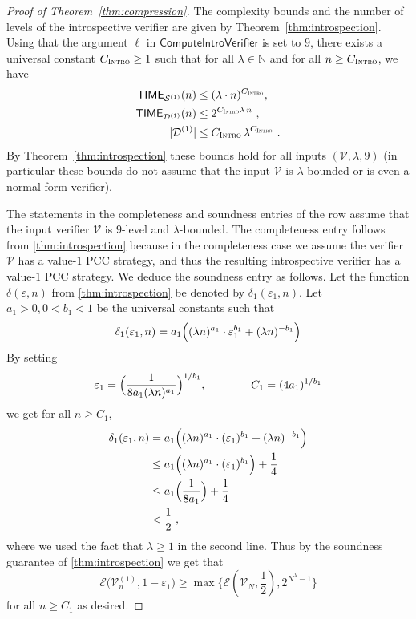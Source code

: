 \documentclass[11pt]{article}
\theoremstyle{definition}
\newcommand{\N}{\ensuremath{\mathbb{N}}}
\newcommand{\eps}{\varepsilon}
\newcommand{\sampler}{\mathcal{S}}
\newcommand{\decider}{\mathcal{D}}
\newcommand{\verifier}{\mathcal{V}}
\newcommand{\gamestyle}[1]{\ensuremath{\textsc{#1}}\xspace}
\newcommand{\intro}{\gamestyle{Intro}}
\newcommand{\Ent}{\mathscr{E}}
\newcommand{\TIME}{\mathsf{TIME}}
\newcommand{\tmstyle}[1]{\ensuremath{\mathsf{#1}}}
\newcommand{\ComputeIntroVerifier}{\tmstyle{ComputeIntroVerifier}}
\begin{document}
\begin{proof}[Proof of Theorem~\ref{thm:compression}]
  The complexity bounds and the number of levels of the introspective verifier are given by
  Theorem~\ref{thm:introspection}. Using that the argument $\ell$ in $\ComputeIntroVerifier$ is set to $9$, 
  there exists a universal constant $C_\intro \geq 1$ such that for all $\lambda\in \N$ and for all $n \geq C_\intro$, we have
  \begin{equation}
    \label{eq:c_intro}
    \begin{split}
    \TIME_{\sampler^{(1)}}(n) & \le (\lambda \cdot n)^{C_\intro},\\
    \TIME_{\decider^{(1)}}(n) & \le 2^{C_\intro \lambda\,n}~, \\
    |\decider^{(1)}| &\le C_\intro \, \lambda^{C_\intro}~.
    \end{split}
  \end{equation}
  By Theorem~\ref{thm:introspection} these bounds hold for all inputs $(\verifier,
  \lambda, 9)$ (in particular these bounds do not assume that the input $\verifier$ is $\lambda$-bounded or is even a normal form verifier).

  The statements in the completeness and soundness entries of the row assume that the input
  verifier $\verifier$ is $9$-level and $\lambda$-bounded. 
  The completeness entry follows from \cref{thm:introspection} because in the completeness case we assume the verifier $\verifier$ has a value-$1$ PCC strategy, and thus the resulting introspective verifier has a value-$1$ PCC strategy. We deduce the soundness entry as follows. 
Let the function $\delta(\eps,n)$ from \cref{thm:introspection} be denoted by $\delta_1(\eps_1,n)$. Let $a_1 > 0, 0 < b_1 < 1$ be the universal constants such that
   \begin{equation}
    \label{eq:re-delta-1}
    \delta_1(\eps_1, n) = a_1 \Bigl((\lambda n)^{a_1} \cdot \eps_1^{b_1} +
    ( \lambda n )^{-b_1} \Bigr)
  \end{equation}
  By setting
  \begin{equation}
  \label{eq:re-eps-1}
  	\eps_1 = \Bigl( \frac{1}{8 a_1 (\lambda n)^{a_1}} \Bigr)^{1/b_1}, \qquad \qquad C_1 = ( 4 a_1 )^{1/b_1}
  \end{equation}
  we get for all $n \geq C_1$, 
  \begin{equation*}
    \begin{split}
      \delta_1(\eps_1,n) &= a_1 \Bigl( (\lambda n)^{a_1} \cdot (\eps_1)^{b_1}+
      ( \lambda n)^{-b_1} \Bigr) \\
      & \le a_1 \Bigl( (\lambda n)^{a_1} \cdot (\eps_1)^{b_1}
      \Bigr) + \frac{1}{4} \\
      & \le a_1 \Bigl( \frac{1}{8 a_1} \Bigr) + \frac{1}{4}\\
      & < \frac{1}{2} \;,
    \end{split}
  \end{equation*}
  where we used the fact that $\lambda \ge 1$ in the second line. Thus by the soundness guarantee of \cref{thm:introspection} we get that
  \[
  	\Ent \big(
    \verifier_n^{(1)}, 1 - \eps_1 \big) \geq \max \big
    \{\Ent(\verifier_N, \frac{1}{2}), 2^{N^\lambda - 1} \big \}
  \]
  for all $n \geq C_1$ as desired.
	

\end{proof}
\end{document}
